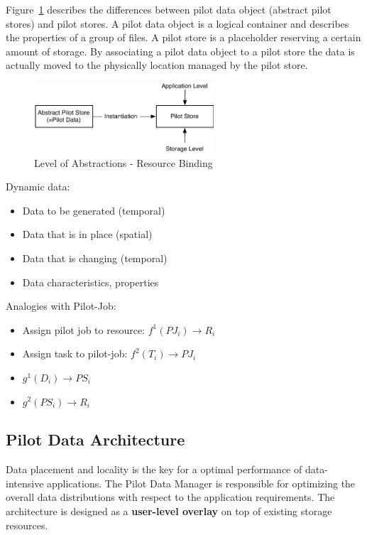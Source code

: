 \documentclass[]{article}
\begin{document}
Figure~\ref{fig:figures_ps-instantiation} describes the differences between
pilot data object (abstract pilot stores) and pilot stores. A pilot data object
is a logical container and describes the properties of a group of files. A pilot
store is a placeholder reserving a certain amount of storage. By associating a
pilot data object to a pilot store the data is actually moved to the physically
location managed by the pilot store.

\begin{figure}[htbp]
    \centering
        \includegraphics[width=0.6\textwidth]{figures/ps-instantiation.pdf}
    \caption{Level of Abstractions - Resource Binding}
    \label{fig:figures_ps-instantiation}
\end{figure}



	
\noindent	
Dynamic data:
\begin{itemize}
	\item Data to be generated (temporal)
	\item Data that is in place (spatial)
	\item Data that is changing (temporal)
	\item Data characteristics, properties
\end{itemize}	

\noindent
Analogies with Pilot-Job:
\begin{itemize}
	\item Assign pilot job to resource: $f^{1}(PJ_i) \rightarrow R_i$
	\item Assign task to pilot-job: $f^{2}(T_i) \rightarrow PJ_i$ 

	\item $g^{1} (D_i) \rightarrow PS_i$
	\item $g^{2} (PS_i) \rightarrow R_i$
\end{itemize}

\subsection{Pilot Data Architecture}


Data placement and locality is the key for a optimal performance of 
data-intensive applications. The Pilot Data Manager is responsible for 
optimizing the overall data distributions with respect to the application 
requirements. The architecture is designed as a \textbf{user-level overlay} on 
top of existing storage resources.
\end{document}
